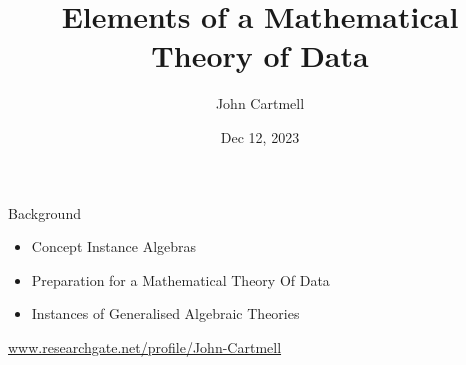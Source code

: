 
\usepackage{mathptmx}
\usepackage{amsfonts}
\usepackage{wasysym}
\usepackage{url}
\usepackage{hyperref}

\newcommand{\sharedmacros}{../../../SharedMacros}










\renewcommand{\erpictureFolder}[0]{../../SharedPictures}
\setcounter{equation}{0}


\title[John Cartmell]{Elements of a Mathematical Theory of Data}

\author{John Cartmell}
\institute{\\}
\date{Dec 12, 2023}

\usepackage{framed}
\usepackage{bibentry}
\usepackage{colortbl}
\usepackage{ulem}   %
\usepackage{listings}
\usepackage{arydshln} %
\usepackage{pst-arrow} %




\newcommand{\slidecontext}{Introduction} %

\newcommand{\comingnext}[1]{
\begin{frame}{COMING NEXT}
\begin{center}
\Large #1
\end{center}
\end{frame}
}



\begin{frame}
\titlepage
{}
\end{frame}

\begin{frame}{Background}
\begin{itemize}
\item Concept Instance Algebras
\item Preparation for a Mathematical Theory Of Data
\item Instances of Generalised Algebraic Theories
\end{itemize}
\vspace{3cm}
\url{www.researchgate.net/profile/John-Cartmell}
\end{frame}


